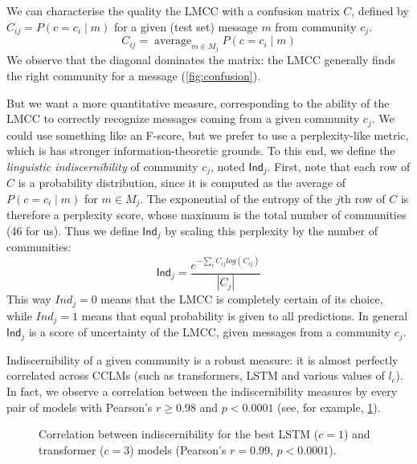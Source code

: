 \documentclass[11pt,a4paper]{article}
\newcommand\Ind{\mathsf{Ind}}
\DeclareMathOperator*{\avg}{average}
\begin{document}
We can characterise the quality the LMCC with a confusion matrix
$C$, defined by $C_{ij} = P(c=c_i \mid m)$ for a given (test set) message $m$ 
from community $c_j$.
\[C_{ij} = \avg_{m\in M_j}P(c=c_i \mid m)\]
We observe that the diagonal dominates the matrix: the LMCC generally finds the right community for a message (\cref{fig:confusion}).
%
\begin{figure*}
\caption{LMCC confusion matrices for the best LSTM (left, $c=1$) and transformer (right, $c=3$) models.}
\label{fig:confusion}
\end{figure*}
%
But we want a more quantitative measure, corresponding to the ability of the LMCC to correctly
recognize messages coming from a given community $c_j$. We could use
something like an F-score, but we prefer to use a perplexity-like metric,
which is has stronger information-theoretic grounds.
To this end, we define the \emph{linguistic indiscernibility} of community $c_j$, 
noted $\Ind_j$. 
First, note that each row of $C$ is a probability distribution,
since it is computed as the average of $P(c=c_i \mid m)$ for $m\in M_j$.
The exponential of the entropy of the $j$th row of \(C\) is therefore a perplexity score,
whose maximum is the total number of communities (46 for us).
Thus we define $\Ind_j$ by scaling this perplexity by the number of communities:
\[\Ind_j = \frac{e^{-\sum_i C_{ij} log(C_{ij})}}{|C_j|}\]
This way $Ind_j=0$ means that the LMCC is completely certain of its
choice, while $Ind_j=1$ means that equal probability is given to all
predictions.  In general $\Ind_j$ is a score of uncertainty of the
LMCC, given messages from a community $c_j$.

Indiscernibility of a given community is a robust measure: it is
almost perfectly correlated across CCLMs (such as transformers, LSTM
and various values of $l_c$).  In fact, we observe a correlation
between the indiscernibility measures by every pair of models with
Pearson's $r \geq 0.98$ and $p < 0.0001$ (see, for example,
\cref{fig:lmcc-ppl}).

\begin{figure}
  \caption{%
    Correlation between indiscernibility for 
    the best LSTM ($c = 1$) and transformer ($c = 3$) models
    (Pearson's $r = 0.99$, $p < 0.0001$).
  }
  \label{fig:lmcc-ppl}
\end{figure}
\end{document}
